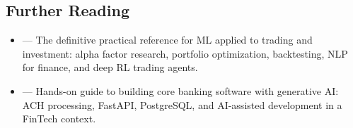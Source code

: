 \subsection*{Further Reading}

\begin{tcbitemize}[ skin=sectionraster ]

    \tcbitem[title=Further Reading, raster multicolumn=6]
    \begin{itemize}
        \item {} --- The definitive practical reference for ML applied to trading and investment: alpha factor research, portfolio optimization, backtesting, NLP for finance, and deep RL trading agents.
        \item {} --- Hands-on guide to building core banking software with generative AI: ACH processing, FastAPI, PostgreSQL, and AI-assisted development in a FinTech context.
    \end{itemize}

\end{tcbitemize}
